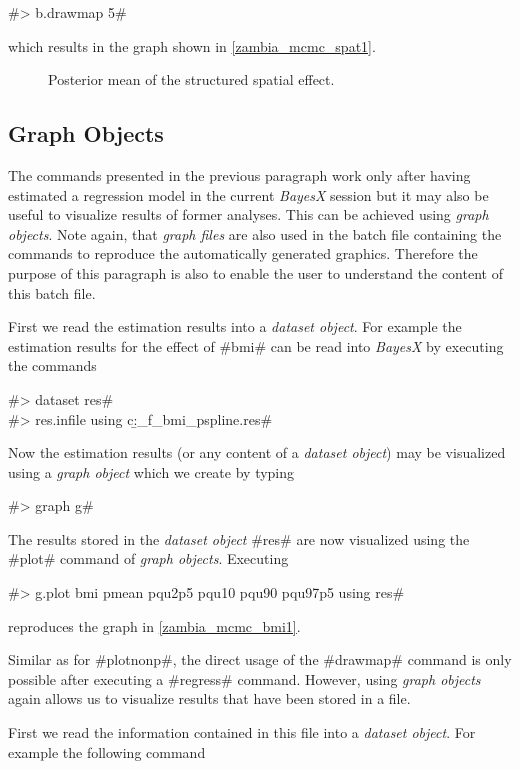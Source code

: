 \documentclass[11pt,a4paper,twoside]{bayesxreport}
\begin{document}
#> b.drawmap 5#

which results in the graph shown in \autoref{zambia_mcmc_spat1}.

\begin{figure}[ht]
\begin{center}
{\it\caption{Posterior mean of the structured spatial
effect.\label{zambia_mcmc_spat1}}}
\end{center}
\end{figure}

\subsection{Graph Objects}

The commands presented in the previous paragraph work only after
having estimated a regression model in the current {\em BayesX}
session but it may also be useful to visualize results of former
analyses. This can be achieved using {\em graph objects}. Note
again, that {\em graph files} are also used in the batch file
containing the commands to reproduce the automatically generated
graphics. Therefore the purpose of this paragraph is also to enable
the user to understand the content of this batch file.

First we read the estimation results into a {\it dataset object}.
For example the estimation results for the effect of #bmi# can be
read into {\it BayesX} by executing the commands

#> dataset res#\\
#> res.infile using c:\data\b_f_bmi_pspline.res#

Now the estimation results (or any content of a {\it dataset
object}) may be visualized using a {\it graph object} which we
create by typing

#> graph g#

The results stored in the {\em dataset object} #res# are now
visualized using the #plot# command of {\it graph objects}.
Executing

#> g.plot bmi pmean pqu2p5 pqu10 pqu90 pqu97p5 using res#

reproduces the graph in \autoref{zambia_mcmc_bmi1}.

Similar as for #plotnonp#, the direct usage of the #drawmap# command
is only possible after executing a #regress# command. However, using
{\it graph objects} again allows us to visualize results that have
been stored in a file.

First we read the information contained in this file into a {\it
dataset object}. For example the following command
\end{document}
